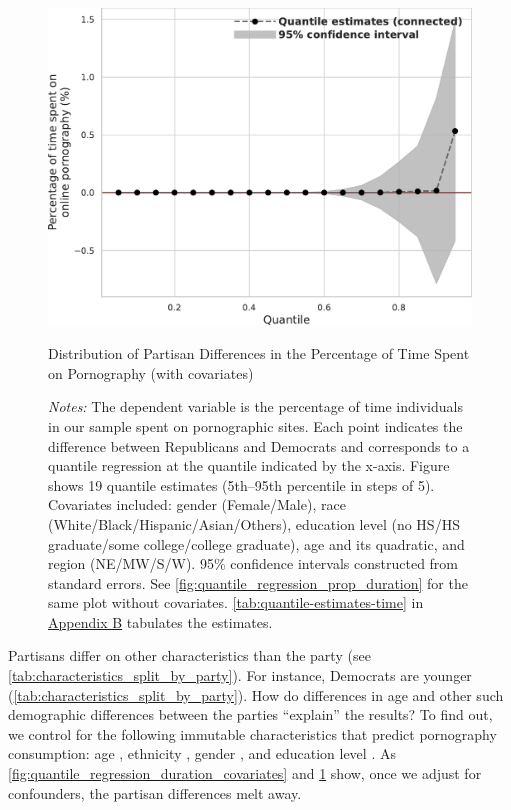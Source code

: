\documentclass[12pt,twoside]{article}
\begin{document}
\begin{figure}[!ht]
	\centering
	\includegraphics[width=.7\linewidth]{figs/quantile_reg_covariates_proportion_duration_adult.pdf}
	\caption{Distribution of Partisan Differences in the Percentage of Time Spent on Pornography (with covariates)}
	\caption*{\footnotesize \emph{Notes:} 
		The dependent variable is the percentage of time individuals in our sample spent on pornographic sites.
		Each point indicates the difference between Republicans and Democrats and corresponds to a quantile regression at the quantile indicated by the x-axis.
  Figure shows 19 quantile estimates (5th--95th percentile in steps of 5).
		Covariates included: gender (Female/Male), race (White/Black/Hispanic/Asian/Others), education level (no HS/HS graduate/some college/college graduate), age and its quadratic, and region (NE/MW/S/W).
		95\% confidence intervals constructed from standard errors.
		See \cref{fig:quantile_regression_prop_duration} for the same plot without covariates.
        \cref{tab:quantile-estimates-time} in \hyperref[sm:smB]{Appendix B} tabulates the estimates.
	}
	\label{fig:quantile_regression_prop_duration_covariates}
\end{figure}

Partisans differ on other characteristics than the party (see \cref{tab:characteristics_split_by_party}). For instance, Democrats are younger (\cref{tab:characteristics_split_by_party}). 
How do differences in age and other such demographic differences between the parties ``explain'' the results? To find out, we control for the following immutable characteristics that predict pornography consumption: age \citep{Wright2013-an, Woodrum1992-vk}, ethnicity \citep{Wright2013-an}, gender \citep{Woodrum1992-vk}, and education level \citep{Woodrum1992-vk}. As \cref{fig:quantile_regression_duration_covariates} and \cref{fig:quantile_regression_prop_duration_covariates} show, once we adjust for confounders, the partisan differences melt away. 
\end{document}
